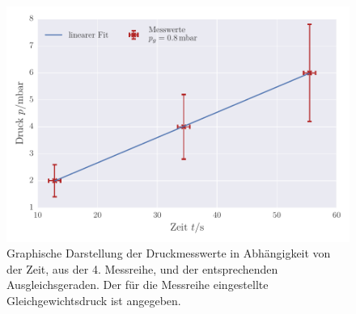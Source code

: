 \begin{figure}[!h]
 \centering
 \includegraphics[scale=0.8]{../Grafiken/Leckrate_Drehschieber_3.pdf}
 \caption{Graphische Darstellung der Druckmesswerte in Abhängigkeit von der Zeit, aus der 4. Messreihe, und der
 entsprechenden Ausgleichsgeraden. Der für die Messreihe eingestellte Gleichgewichtsdruck ist angegeben.\label{fig:leckrate_drehschieber_3}}
 \end{figure} 